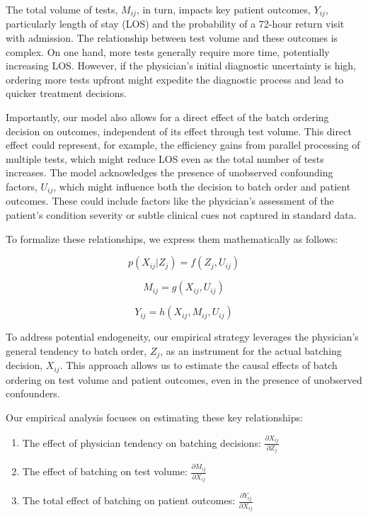 \documentclass[,,nonblindrev]{informs}
\begin{document}
The total volume of tests, \(M_{ij}\), in turn, impacts key patient
outcomes, \(Y_{ij}\), particularly length of stay (LOS) and the
probability of a 72-hour return visit with admission. The relationship
between test volume and these outcomes is complex. On one hand, more
tests generally require more time, potentially increasing LOS. However,
if the physician's initial diagnostic uncertainty is high, ordering more
tests upfront might expedite the diagnostic process and lead to quicker
treatment decisions.

Importantly, our model also allows for a direct effect of the batch
ordering decision on outcomes, independent of its effect through test
volume. This direct effect could represent, for example, the efficiency
gains from parallel processing of multiple tests, which might reduce LOS
even as the total number of tests increases. The model acknowledges the
presence of unobserved confounding factors, \(U_{ij}\), which might
influence both the decision to batch order and patient outcomes. These
could include factors like the physician's assessment of the patient's
condition severity or subtle clinical cues not captured in standard
data.

To formalize these relationships, we express them mathematically as
follows:

\begin{equation}
p(X_{ij}|Z_j) = f(Z_j, U_{ij})
\end{equation}

\begin{equation}
M_{ij} = g(X_{ij}, U_{ij})
\end{equation}

\begin{equation}
Y_{ij} = h(X_{ij}, M_{ij}, U_{ij})
\end{equation}

To address potential endogeneity, our empirical strategy leverages the
physician's general tendency to batch order, \(Z_j\), as an instrument
for the actual batching decision, \(X_{ij}\). This approach allows us to
estimate the causal effects of batch ordering on test volume and patient
outcomes, even in the presence of unobserved confounders.

Our empirical analysis focuses on estimating these key relationships:

\begin{enumerate}
  \item The effect of physician tendency on batching decisions: $\frac{\partial X_{ij}}{\partial Z_j}$
  \item The effect of batching on test volume: $\frac{\partial M_{ij}}{\partial X_{ij}}$
  \item The total effect of batching on patient outcomes: $\frac{\partial Y_{ij}}{\partial X_{ij}}$
\end{enumerate}
\end{document}
